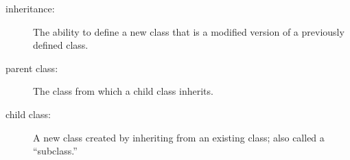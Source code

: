 \begin{description}

\item[inheritance:] The ability to define a new class that is a
modified version of a previously defined class.

\item[parent class:] The class from which a child class inherits.

\item[child class:] A new class created by inheriting from an
existing class; also called a ``subclass.''


\end{description}
